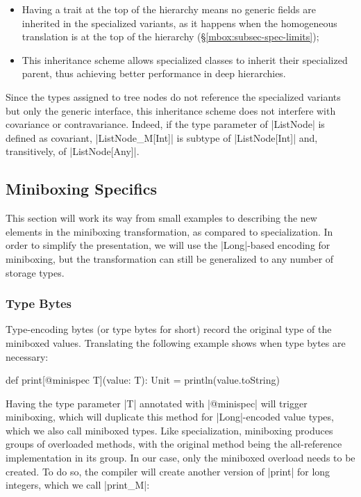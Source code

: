 \begin{itemize}
 \item Having a trait at the top of the hierarchy means no generic fields are inherited in the specialized variants, as it happens when the homogeneous translation is at the top of the hierarchy (\S\ref{mbox:subsec-spec-limits});
 \item This inheritance scheme allows specialized classes to inherit their specialized parent, thus achieving better performance in deep hierarchies.
\end{itemize}

Since the types assigned to tree nodes do not reference the specialized variants but only the generic interface, this inheritance scheme does not interfere with covariance or contravariance. Indeed, if the type parameter of |ListNode| is defined as covariant, |ListNode_M[Int]| is subtype of |ListNode[Int]| and, transitively, of |ListNode[Any]|.

\subsection{Miniboxing Specifics}

This section will work its way from small examples to describing the new elements in the miniboxing transformation, as compared to specialization. In order to simplify the presentation, we will use the |Long|-based encoding for miniboxing, but the transformation can still be generalized to any number of storage types.

\subsubsection*{Type Bytes}
\label{mbox:sec-mb-traf-type-bytes}

Type-encoding bytes (or type bytes for short) record the original type of the miniboxed values. Translating the following example shows when type bytes are necessary:

\begin{lstlisting-nobreak}
 def print[@minispec T](value: T): Unit = println(value.toString)
\end{lstlisting-nobreak}

Having the type parameter |T| annotated with |@minispec| will trigger miniboxing, which will duplicate this method for |Long|-encoded value types, which we also call miniboxed types. Like specialization, miniboxing produces groups of overloaded methods, with the original method being the all-reference implementation in its group. In our case, only the miniboxed overload needs to be created. To do so, the compiler will create another version of |print| for long integers, which we call |print_M|:

